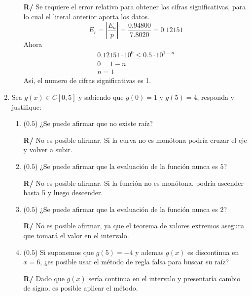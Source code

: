 \documentclass[12pt]{article}
\begin{document}
\begin{enumerate}[leftmargin=*,widest=9]
\begin{enumerate}[label=\alph*]
\textbf{R/} Se requiere el error relativo para obtener las cifras significativas, para lo cual el literal anterior aporta los datos.
\[E_r = \left| \frac{E_a}{p}\right| = \frac{0.94800}{7.8020} = 0.12151\]
Ahora
\begin{eqnarray*}
0.12151 \cdot 10^0 \leq 0.5 \cdot 10^{1-n} \\ 0 = 1-n \\ n = 1
\end{eqnarray*}
Así, el numero de cifras significativas es 1.
\end{enumerate}
   \item Sea \(g(x) \in C[0, 5]\) y sabiendo que \(g(0)= 1\) y \(g(5)=4\), responda y justifique:
   \begin{enumerate}[label=\alph*]
    \item (\(0.5\)) ¿Se puede afirmar que no existe raíz?

\textbf{R/} No es posible afirmar. Si la curva no es monótona podría cruzar el eje y volver a subir.
\item (\(0.5\)) ¿Se puede afirmar que la evaluación de la función nunca es \(5\)?

\textbf{R/} No es posible afirmar. Si la función no es monótona, podría ascender hasta 5 y luego descender.
\item (\(0.5\)) ¿Se puede afirmar que la evaluación de la función nunca es \(2\)?

\textbf{R/} No es posible afirmar, ya que el teorema de valores extremos asegura que tomará el valor en el intervalo.
\item (\(0.5\)) Si suponemos que \(g(5)=-4\) y ademas \(g(x)\) es discontinua en \(x=6\), ¿es posible usar el método de regla falsa para buscar su raíz?

\textbf{R/} Dado que \(g(x) \) sería continua en el intervalo y presentaría cambio de signo, es posible aplicar el método.
  \end{enumerate}
\end{enumerate}
\end{document}
